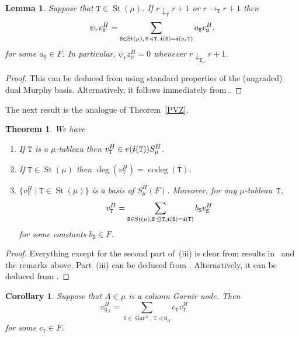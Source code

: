 \documentclass[twoside,11pt,reqno]{amsart}
\numberwithin{equation}{section}
\newtheorem{Lemma}[equation]{Lemma}
\newtheorem{Theorem}[equation]{Theorem}
\newtheorem{Corollary}[equation]{Corollary}
\theoremstyle{definition}  %
\DeclareMathOperator\ldom {\triangleleft}
\DeclareMathOperator\ledom{\trianglelefteq}
\def\bi{\text{\boldmath$i$}}
\newcommand{\St}{\operatorname{St}}
\newcommand{\Stab}{\operatorname{Stab}}
\newcommand{\0}{{\bar 0}}
\newcommand{\1}{{\bar 1}}
\newcommand{\La}{\Lambda}
\newcommand{\al}{\alpha}
\newcommand\Par[1][]{{\mathscr P}^{\kappa#1}}
\def\T{{\mathtt T}}
\def\Stab{{\mathtt S}}
\def\G{{\mathtt G}}
\def\codeg{\operatorname{codeg}}
\def\Gar{{\operatorname{Gar}}}
\begin{document}
\begin{Lemma}\label{signed LPsiStr} 
Suppose that %
$\T \in\St(\mu)$. 
If $r\downarrow_\T  r+1$ or $r\rightarrow_\T  r+1$ %
then
$$
\psi_rv^H_\T =\sum_{\Stab\in \St(\mu),\,\Stab\ldom \T,\,\bi(\Stab)=\bi(s_r\T)}a_\Stab v^H_\Stab.
$$
for some $a_\Stab\in F$. 
In particular, $\psi_rz^H_\mu=0$ whenever $r\downarrow_{\T_\mu}  r+1$. 
\end{Lemma}

\begin{proof}
  This can be deduced from \cite[Proposition~6.10(c)]{HM} using standard properties of the
  (ungraded) dual Murphy basis.  Alternatively, it follows immediately from
  \cite[Corollary~3.12]{HM2}.
\end{proof}

The next result is the analogue of Theorem~\ref{PVZ}. 

\begin{Theorem}\label{signed PVZ} 
We have 
\begin{enumerate}
\item[{\rm (i)}] If $\T$ is a $\mu$-tableau then $v^H_\T\in e(\bi(\T))S_\mu^H$. 
\item[{\rm (ii)}] If $\T\in\St(\mu)$ then $\deg(v^H_\T)=\codeg(\T)$. 
\item[{\rm (iii)}] $\{v^H_\T\mid \T\in \St(\mu)\}$ is a basis of  $S_\mu^H(F)$. Moreover, for any 
$\mu$-tableau~$\T$, 
$$
v^H_\T=\sum_{\Stab\in \St(\mu),\Stab\ledom \T,\bi(\Stab)=\bi(\T)}b_\Stab v^H_\Stab
$$
for some constants $b_\Stab\in F$. 
\end{enumerate}
\end{Theorem}

\begin{proof}
  Everything except for the second part of~(iii) is clear from results in~\cite{HM} and the
  remarks above. Part~(iii) can be deduced from \cite[Proposition~6.10(c)]{HM}. Alternatively,
  it can be deduced from  \cite[Theorem~3.9]{HM2}.
\end{proof}


\begin{Corollary}\label{signed C10910}%
Suppose that %
$A\in \mu$ is a column Garnir node. Then 
$$
v^H_{\G_A}=\sum_{\T\in\Gar^A,\ \T\ldom \G_A}c_\T v^H_\T\qquad
$$
for some $c_\T\in F$. 
\end{Corollary}
\end{document}
